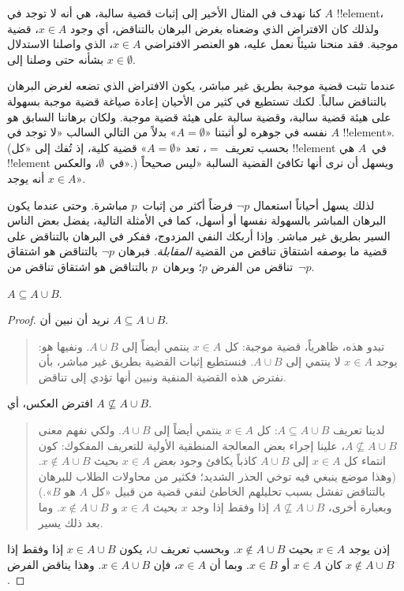 \documentclass[../../../include/open-logic-section]{subfiles}
\begin{document}
كنا نهدف في المثال الأخير إلى إثبات قضية سالبة، هي أنه لا توجد في $A$
!!{element}، ولذلك كان الافتراض الذي وضعناه بغرض البرهان بالتناقض، أي
وجود $x \in A$، قضية موجبة. فقد منحنا شيئاً نعمل عليه، هو العنصر
الافتراضي $x \in A$، الذي واصلنا الاستدلال بشأنه حتى وصلنا إلى
$x \in \emptyset$.

عندما تثبت قضية موجبة بطريق غير مباشر، يكون الافتراض الذي تضعه لغرض
البرهان بالتناقض سالباً. لكنك تستطيع في كثير من الأحيان إعادة صياغة قضية
موجبة بسهولة على هيئة قضية سالبة، وقضية سالبة على هيئة قضية موجبة.
ولكان برهاننا السابق هو نفسه في جوهره لو أثبتنا «$A = \emptyset$» بدلاً
من التالي السالب «لا توجد في $A$ !!{element}». (بحسب تعريف $=$، تعد
«$A = \emptyset$» قضية كلية، إذ تُفك إلى «كل !!{element} في~$A$ هي
!!{element} في~$\emptyset$، والعكس».) ويسهل أن نرى أنها تكافئ القضية
السالبة «ليس صحيحاً أنه يوجد $x \in A$».

لذلك يسهل أحياناً استعمال $\lnot p$ فرضاً أكثر من إثبات~$p$ مباشرة.
وحتى عندما يكون البرهان المباشر بالسهولة نفسها أو أسهل، كما في الأمثلة
التالية، يفضل بعض الناس السير بطريق غير مباشر. وإذا أربكك النفي المزدوج،
ففكر في البرهان بالتناقض على قضية ما بوصفه اشتقاق تناقض من القضية
\emph{المقابلة}. فبرهان $\lnot p$ بالتناقض هو اشتقاق تناقض من الفرض
$p$؛ وبرهان~$p$ بالتناقض هو اشتقاق تناقض من~$\lnot p$.

\begin{prop}
$A \subseteq A \cup B$.
\end{prop}

\begin{proof}
  نريد أن نبين أن $A \subseteq A \cup B$.
  \begin{quote}
    تبدو هذه، ظاهرياً، قضية موجبة: كل $x \in A$ ينتمي أيضاً إلى
    $A \cup B$. ونفيها هو: يوجد $x \in A$ لا ينتمي إلى $A \cup B$.
    فنستطيع إثبات القضية بطريق غير مباشر، بأن نفترض هذه القضية المنفية
    ونبين أنها تؤدي إلى تناقض.
    \end{quote}
  افترض العكس، أي $A \nsubseteq A \cup B$.
  \begin{quote}
    لدينا تعريف $A \subseteq A \cup B$: كل $x \in A$ ينتمي أيضاً إلى
    $A \cup B$. ولكي نفهم معنى $A \nsubseteq A \cup B$، علينا إجراء
    بعض المعالجة المنطقية الأولية للتعريف المفكوك: كون انتماء كل
    $x \in A$ إلى $A \cup B$ كاذباً يكافئ وجود \emph{بعض}
    $x \in A$ بحيث $x \notin A \cup B$. (وهذا موضع ينبغي فيه توخي
    الحذر الشديد؛ فكثير من محاولات الطلاب للبرهان بالتناقض تفشل بسبب
    تحليلهم الخاطئ لنفي قضية من قبيل «كل $A$ هو $B$».) وبعبارة أخرى،
    $A \nsubseteq A \cup B$ إذا وفقط إذا وجد $x$ بحيث $x \in A$ و
    $x \notin A \cup B$. وما بعد ذلك يسير.
  \end{quote}
  إذن يوجد $x \in A$ بحيث $x \notin A \cup B$. وبحسب تعريف $\cup$،
  يكون $x \in A \cup B$ إذا وفقط إذا كان $x \in A$ أو $x \in B$.
  وبما أن $x \in A$، فإن $x \in A \cup B$. وهذا يناقض الفرض
  $x \notin A \cup B$.
\end{proof}
\end{document}
